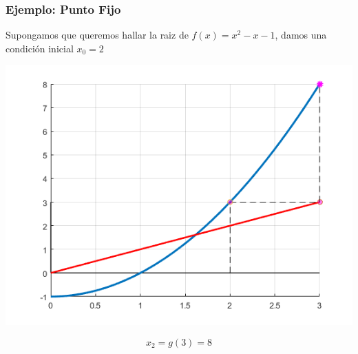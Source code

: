 \documentclass[xcolor=svgnames]{beamer} %
\theoremstyle{plain}
\theoremstyle{definition}
\begin{document}
\begin{frame}
\frametitle{Ejemplo: Punto Fijo}

Supongamos que queremos hallar la raiz de $f(x) =x^2-x-1$,
damos una condición inicial $x_0=2$


\begin{minipage}{.75\linewidth}
\includegraphics[width=\linewidth]{fp_example2/iter2.png} 

\end{minipage}  \begin{minipage}{.2\linewidth}
$$ x_2 = g(3) = 8$$

\end{minipage}
\end{frame}
\end{document}
